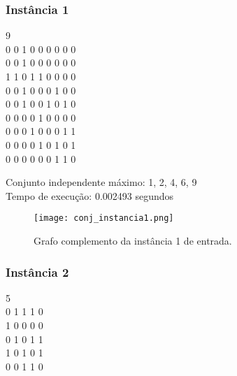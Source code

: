 \documentclass[12pt]{article}
\begin{document}
    \subsubsection{Instância 1}
        \begin{tcolorbox}[title=Arquivo de entrada para a instância 1, width=\linewidth, 
          fontupper=\ttfamily, 
          halign=flush left]
            9 \\
            0 0 1 0 0 0 0 0 0 \\
            0 0 1 0 0 0 0 0 0 \\
            1 1 0 1 1 0 0 0 0 \\
            0 0 1 0 0 0 1 0 0 \\
            0 0 1 0 0 1 0 1 0 \\
            0 0 0 0 1 0 0 0 0 \\
            0 0 0 1 0 0 0 1 1 \\
            0 0 0 0 1 0 1 0 1 \\
            0 0 0 0 0 0 1 1 0 \\
        \end{tcolorbox}

        \begin{tcolorbox}[title=Saída da instância 1, width=\linewidth, 
          fontupper=\ttfamily, 
          halign=flush left]
            Conjunto independente máximo: {1, 2, 4, 6, 9}\\
            Tempo de execução: 0.002493 segundos\\
        \end{tcolorbox}

        \begin{figure}[H]
            \centering
            \texttt{[image: conj\_instancia1.png]}
            \caption{Grafo complemento da instância 1 de entrada.}
            \label{fig:instancia1}
        \end{figure}

        \subsubsection{Instância 2}
        \begin{tcolorbox}[title=Arquivo de entrada para a instância 2, width=\linewidth, 
          fontupper=\ttfamily, 
          halign=flush left]
            5 \\
            0 1 1 1 0 \\
            1 0 0 0 0 \\
            0 1 0 1 1 \\
            1 0 1 0 1 \\
            0 0 1 1 0 \\
        \end{tcolorbox}
\end{document}

